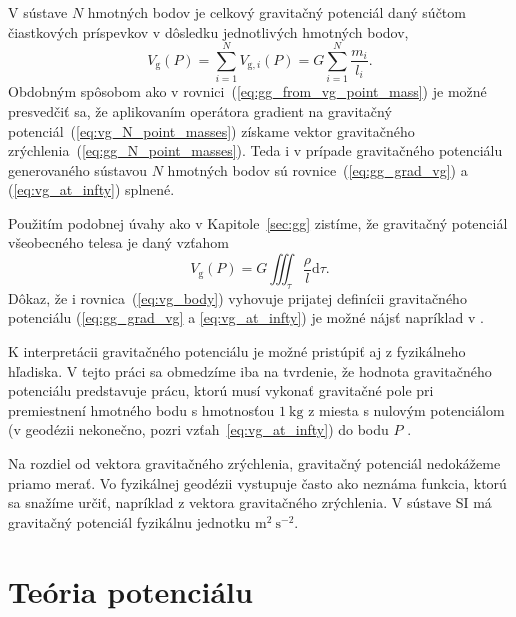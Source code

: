 \documentclass[a4paper, 12pt]{book}
\newcommand{\diff}{\mathrm d}
\newcommand{\gidx}{\mathrm g}
\begin{document}
V sústave $N$ hmotných bodov je celkový gravitačný potenciál daný súčtom 
čiastkových príspevkov v dôsledku jednotlivých hmotných bodov,
%
\begin{equation}
\label{eq:vg_N_point_masses}
V_\gidx(P) = \sum_{i = 1}^{N} V_{\gidx,i}(P) = G \sum_{i = 1}^{N}\frac{
m_i}{l_i}{.}
\end{equation}
%
Obdobným spôsobom ako v rovnici~(\ref{eq:gg_from_vg_point_mass}) je možné 
presvedčiť sa, že aplikovaním operátora gradient na gravitačný 
potenciál~(\ref{eq:vg_N_point_masses}) získame vektor gravitačného 
zrýchlenia~(\ref{eq:gg_N_point_masses}).  Teda i v prípade gravitačného 
potenciálu generovaného sústavou $N$ hmotných bodov sú 
rovnice~(\ref{eq:gg_grad_vg}) a (\ref{eq:vg_at_infty}) splnené.

Použitím podobnej úvahy ako v Kapitole~\ref{sec:gg} zistíme, že gravitačný 
potenciál všeobecného telesa je daný vzťahom
%
\begin{equation}
\label{eq:vg_body}
V_\gidx(P) = G \iiint_{\tau} \frac{\rho}{l} \diff\tau{.}
\end{equation}
%
Dôkaz, že i rovnica~(\ref{eq:vg_body}) vyhovuje prijatej definícii gravitačného 
potenciálu (\ref{eq:gg_grad_vg} a \ref{eq:vg_at_infty}) je možné nájsť 
napríklad v \cite{MacMillan1930}.

K interpretácii gravitačného potenciálu je možné pristúpiť aj z fyzikálneho 
hľadiska.  V tejto práci sa obmedzíme iba na tvrdenie, že hodnota gravitačného 
potenciálu predstavuje prácu, ktorú musí vykonať gravitačné pole pri 
premiestnení hmotného bodu s hmotnosťou $1\ \mathrm{kg}$ z miesta s nulovým 
potenciálom (v geodézii nekonečno, pozri vzťah~\ref{eq:vg_at_infty}) do bodu $P$ 
\citep{MacMillan1930,Kellogg1967,TorgeGeodesy}.

Na rozdiel od vektora gravitačného zrýchlenia, gravitačný potenciál nedokážeme 
priamo merať.  Vo fyzikálnej geodézii vystupuje často ako neznáma funkcia, 
ktorú sa snažíme určiť, napríklad z vektora gravitačného zrýchlenia.  V sústave 
SI má gravitačný potenciál fyzikálnu jednotku $\mathrm{m}^2\ \mathrm{s}^{-2}$.







\section{Teória potenciálu}
\end{document}

